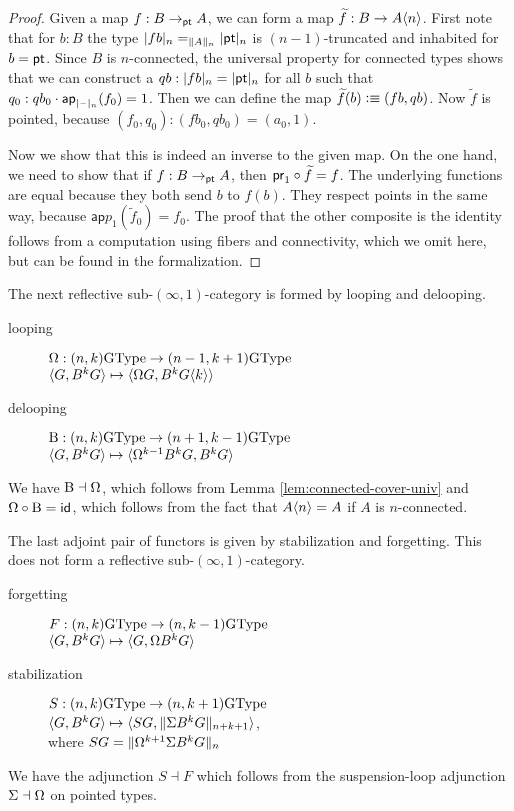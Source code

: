 \begin{proof}
  Given a map $f:B\to_\pt A$, we can form a map $\widetilde f: B \to A{\angled n}$. First note that for $b:B$ the type $\truncunit{fb}_n=_{\trunc{n}{A}}\truncunit{\pt}_n$ is $(n-1)$-truncated and inhabited for $b=\pt$. Since $B$ is $n$-connected, the universal property for connected types shows that we can construct a $qb:\truncunit{fb}_n=\truncunit{\pt}_n$ for all $b$ such that $q_0:qb_0\cdot\mathsf{ap}_{\truncunit{\blank}_n}(f_0)=1$. Then we can define the map $\widetilde f(b)\defeq (fb, qb)$. Now $\widetilde f$ is pointed, because $(f_0,q_0):(fb_0,qb_0)=(a_0,1)$.

  Now we show that this is indeed an inverse to the given map. On the one hand, we need to show that if $f: B \to_\pt A$, then $\proj 1 \circ \widetilde f=f$. The underlying functions are equal because they both send $b$ to $f(b)$. They respect points in the same way, because
  $\mathsf{ap}{p_1}(\widetilde f_0)=f_0$. The proof that the other composite is the identity follows from a computation using fibers and connectivity, which we omit here, but can be found in the formalization.
\end{proof}

The next reflective sub-$(\infty,1)$-category is formed by looping and delooping.
\begin{description}
\item[looping] $\loopspacesym : (n,k)\GType \to (n-1,k+1)\GType$ \\
  $\angled{G,B^kG} \mapsto \angled{\loopspacesym G,B^kG{\angled k}}$
\item[delooping] $\B : (n,k)\GType \to (n+1,k-1)\GType$ \\
  $\angled{G,B^kG} \mapsto \angled{\loopspacesym^{k-1}B^kG,B^kG}$
\end{description}
We have ${\B} \dashv {\loopspacesym}$, which follows from Lemma \ref{lem:connected-cover-univ} %
and $\loopspacesym\circ{\B} = \idfunc$, which follows from the fact that $A{\angled n}=A$ if $A$ is $n$-connected.

The last adjoint pair of functors is given by stabilization and forgetting. This does not form a reflective sub-$(\infty,1)$-category.
\begin{description}
\item[forgetting] $F : (n,k)\GType \to (n,k-1)\GType$ \\
  $\angled{G,B^kG} \mapsto \angled{G,\loopspacesym B^kG}$
\item[stabilization] $S : (n,k)\GType \to (n,k+1)\GType$ \\
  $\angled{G,B^kG} \mapsto \angled{SG,\trunc{n+k+1}{\susp B^kG}}$,\\
  where $SG = \trunc{n}{\loopspacesym^{k+1}\susp B^kG}$
\end{description}
We have the adjunction ${S} \dashv {F}$ which follows from the suspension-loop adjunction $\Sigma\dashv\loopspacesym$ on pointed types.

